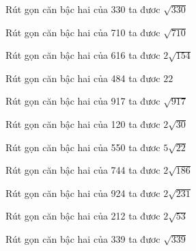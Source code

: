 \documentclass[12pt,a4paper]{article}
\begin{document}
\begin{ex}
Rút gọn căn bậc hai của 330 ta đươc $\sqrt{330}$
\end{ex}
\begin{ex}
Rút gọn căn bậc hai của 710 ta đươc $\sqrt{710}$
\end{ex}
\begin{ex}
Rút gọn căn bậc hai của 616 ta đươc $2\sqrt{154}$
\end{ex}
\begin{ex}
Rút gọn căn bậc hai của 484 ta đươc $22$
\end{ex}
\begin{ex}
Rút gọn căn bậc hai của 917 ta đươc $\sqrt{917}$
\end{ex}
\begin{ex}
Rút gọn căn bậc hai của 120 ta đươc $2\sqrt{30}$
\end{ex}
\begin{ex}
Rút gọn căn bậc hai của 550 ta đươc $5\sqrt{22}$
\end{ex}
\begin{ex}
Rút gọn căn bậc hai của 744 ta đươc $2\sqrt{186}$
\end{ex}
\begin{ex}
Rút gọn căn bậc hai của 924 ta đươc $2\sqrt{231}$
\end{ex}
\begin{ex}
Rút gọn căn bậc hai của 212 ta đươc $2\sqrt{53}$
\end{ex}
\begin{ex}
Rút gọn căn bậc hai của 339 ta đươc $\sqrt{339}$
\end{ex}
\end{document}
